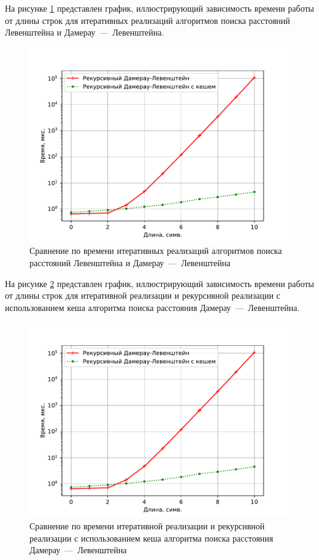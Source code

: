 На рисунке \ref{plt:time_02} представлен график, иллюстрирующий зависимость времени работы от длины строк для итеративных реализаций алгоритмов поиска расстояний Левенштейна и Дамерау~---~Левенштейна.
\begin{figure}[H]
	\centering
	\includegraphics[height=0.5\textheight, page=2]{img/figures.pdf}
	\caption{Сравнение по времени итеративных реализаций алгоритмов поиска расстояний Левенштейна и Дамерау~---~Левенштейна}
	\label{plt:time_02}
\end{figure}

На рисунке \ref{plt:time_03} представлен график, иллюстрирующий зависимость времени работы от длины строк для итеративной реализации и рекурсивной реализации с использованием кеша алгоритма поиска расстояния Дамерау~---~Левенштейна. 
\begin{figure}[H]
	\centering
	\includegraphics[height=0.5\textheight, page=3]{img/figures.pdf}
	\caption{Сравнение по времени итеративной реализации и рекурсивной реализации с использованием кеша алгоритма поиска расстояния Дамерау~---~Левенштейна}
	\label{plt:time_03}
\end{figure}

